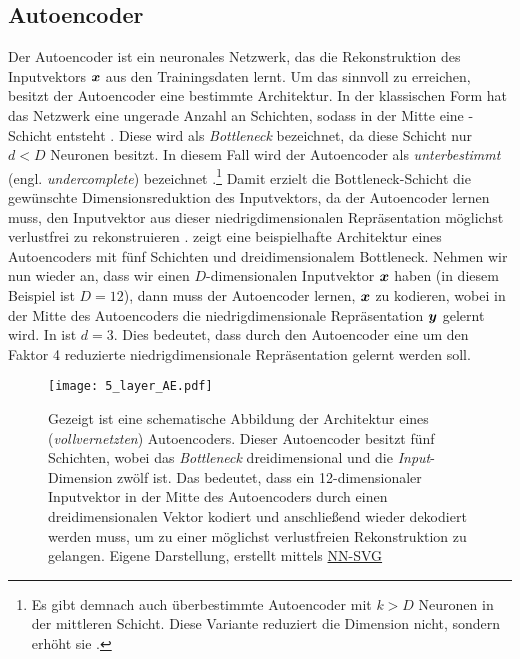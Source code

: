 \subsection{Autoencoder}
\label{ch:MethodenDerDimRed:ML:AE}

Der Autoencoder ist ein neuronales Netzwerk, das die Rekonstruktion des Inputvektors $\bm{x}$ aus
den Trainingsdaten lernt. Um das sinnvoll zu erreichen, besitzt der Autoencoder eine bestimmte
Architektur. In der klassischen Form hat das Netzwerk eine ungerade Anzahl an Schichten, sodass in
der Mitte eine -Schicht entsteht \parencite[2]{Bank.2020}. Diese wird als \textit{Bottleneck} bezeichnet, da diese Schicht nur $d < D$
Neuronen besitzt. In diesem Fall wird der Autoencoder als \textit{unterbestimmt} (engl.
\textit{undercomplete}) bezeichnet \parencite[503]{Goodfellow.2016}.\footnote{Es gibt demnach auch überbestimmte Autoencoder mit $k > D$
	Neuronen in der mittleren Schicht. Diese Variante reduziert die Dimension nicht, sondern erhöht sie \parencite[504]{Goodfellow.2016}.} Damit erzielt die Bottleneck-Schicht die gewünschte
Dimensionsreduktion des Inputvektors, da der Autoencoder lernen muss, den Inputvektor aus dieser
niedrigdimensionalen Repräsentation möglichst verlustfrei zu rekonstruieren \parencites[502]{Goodfellow.2016}[2]{Bank.2020}.  zeigt eine
beispielhafte Architektur eines Autoencoders mit fünf Schichten und dreidimensionalem Bottleneck.
Nehmen wir nun wieder an, dass wir einen $D$-dimensionalen Inputvektor $\bm{x}$ haben (in diesem
Beispiel ist $D = 12$), dann muss der Autoencoder lernen, $\bm{x}$ zu kodieren, wobei in der
Mitte des Autoencoders die niedrigdimensionale Repräsentation $\bm{y}$ gelernt wird. In
 ist $d = 3$. Dies bedeutet, dass durch den Autoencoder eine um den
Faktor 4 reduzierte niedrigdimensionale Repräsentation gelernt werden soll.
\begin{figure}[h]
	\label{fig:5-layer-Autoencoder}
	\begin{center}
		\texttt{[image: 5\_layer\_AE.pdf]}
		\caption[Schematische Abbildung der Architektur eines Autoencoders]{Gezeigt ist eine schematische Abbildung der Architektur eines (\textit{vollvernetzten}) Autoencoders. Dieser Autoencoder besitzt fünf Schichten, wobei das \textit{Bottleneck} dreidimensional und die \textit{Input}-Dimension zwölf ist. Das bedeutet, dass ein 12-dimensionaler Inputvektor in der Mitte des Autoencoders durch einen dreidimensionalen Vektor kodiert und anschließend wieder dekodiert werden muss, um zu einer möglichst verlustfreien Rekonstruktion zu gelangen. Eigene Darstellung, erstellt mittels \href{https://alexlenail.me/NN-SVG/}{NN-SVG}}
	\end{center}
\end{figure}

